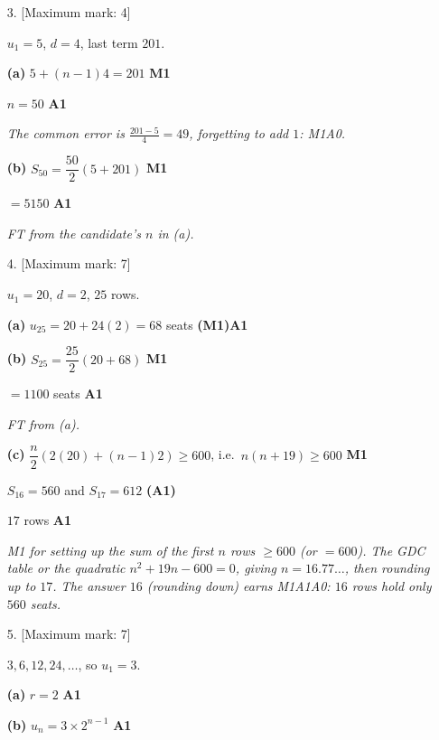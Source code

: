 \documentclass[12pt, twoside]{article}
\begin{document}
\begin{enumerate}[itemsep=0.3cm]
\item[3.] [Maximum mark: 4]

$u_{1} = 5$, $d = 4$, last term $201$.

\textbf{(a)} $5 + (n - 1)4 = 201$ \hfill \textbf{M1}

$n = 50$ \hfill \textbf{A1}

\emph{The common error is $\frac{201 - 5}{4} = 49$, forgetting to add $1$:
M1A0.}

\textbf{(b)} $S_{50} = \dfrac{50}{2}(5 + 201)$ \hfill \textbf{M1}

$= 5150$ \hfill \textbf{A1}

\emph{FT from the candidate's $n$ in (a).}

\medskip

\item[4.] [Maximum mark: 7]

$u_{1} = 20$, $d = 2$, $25$ rows.

\textbf{(a)} $u_{25} = 20 + 24(2) = 68$ seats \hfill \textbf{(M1)A1}

\textbf{(b)} $S_{25} = \dfrac{25}{2}(20 + 68)$ \hfill \textbf{M1}

$= 1100$ seats \hfill \textbf{A1}

\emph{FT from (a).}

\textbf{(c)} $\dfrac{n}{2}\left(2(20) + (n - 1)2\right) \geq 600$, \quad
i.e.\ $n(n + 19) \geq 600$ \hfill \textbf{M1}

$S_{16} = 560$ and $S_{17} = 612$ \hfill \textbf{(A1)}

$17$ rows \hfill \textbf{A1}

\emph{M1 for setting up the sum of the first $n$ rows $\geq 600$ (or $= 600$).
The GDC table or the quadratic $n^{2} + 19n - 600 = 0$, giving
$n = 16.77\ldots$, then rounding \emph{up} to $17$. The answer $16$ (rounding
down) earns M1A1A0: $16$ rows hold only $560$ seats.}

\newpage

\item[5.] [Maximum mark: 7]

$3, 6, 12, 24, \ldots$, so $u_{1} = 3$.

\textbf{(a)} $r = 2$ \hfill \textbf{A1}

\textbf{(b)} $u_{n} = 3 \times 2^{n - 1}$ \hfill \textbf{A1}


\end{enumerate}
\end{document}
